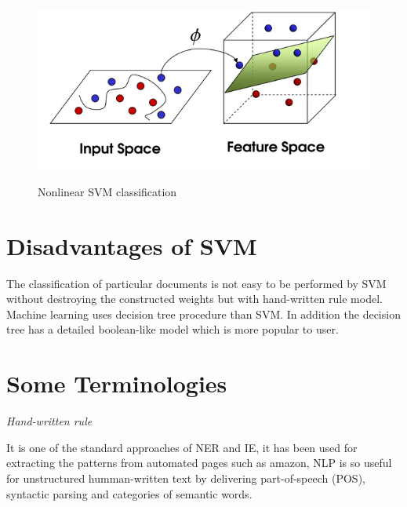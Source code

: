 \begin{figure}[hbtp]
\caption{Nonlinear SVM classification}
\centering
\includegraphics[scale=.7]{images/SVMNL.png}\label{SVMNL}
\end{figure}
 
\section{Disadvantages of SVM} 
The classification of particular documents is not easy to be performed by SVM without destroying the constructed weights  but with hand-written rule model. Machine learning uses decision tree procedure than SVM. In addition the decision tree has a detailed boolean-like  model which is more popular to user.

\newpage

\section{Some Terminologies}

\textit{Hand-written rule}

It is one of the standard approaches of NER and IE, it has been used for extracting the patterns from automated pages such as amazon, NLP is so useful for unstructured humman-written text by delivering  part-of-speech (POS), syntactic parsing and categories of semantic words.

